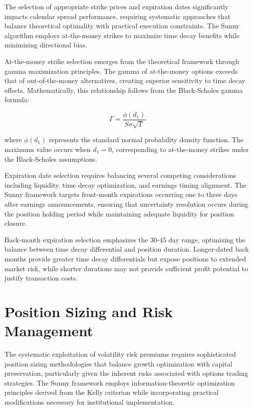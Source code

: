 \documentclass[
  american,
  11pt,
  11pt,
  letterpaper,
  onecolumn]{article}
\begin{document}
The selection of appropriate strike prices and expiration dates
significantly impacts calendar spread performance, requiring systematic
approaches that balance theoretical optimality with practical execution
constraints. The Sunny algorithm employs at-the-money strikes to
maximize time decay benefits while minimizing directional bias.

At-the-money strike selection emerges from the theoretical framework
through gamma maximization principles. The gamma of at-the-money options
exceeds that of out-of-the-money alternatives, creating superior
sensitivity to time decay effects. Mathematically, this relationship
follows from the Black-Scholes gamma formula:

\[\Gamma = \frac{\phi(d_1)}{S \sigma \sqrt{T}}\]

where \(\phi(d_1)\) represents the standard normal probability density
function. The maximum value occurs when \(d_1 = 0\), corresponding to
at-the-money strikes under the Black-Scholes assumptions.

Expiration date selection requires balancing several competing
considerations including liquidity, time decay optimization, and
earnings timing alignment. The Sunny framework targets front-month
expirations occurring one to three days after earnings announcements,
ensuring that uncertainty resolution occurs during the position holding
period while maintaining adequate liquidity for position closure.

Back-month expiration selection emphasizes the 30-45 day range,
optimizing the balance between time decay differential and position
duration. Longer-dated back months provide greater time decay
differentials but expose positions to extended market risk, while
shorter durations may not provide sufficient profit potential to justify
transaction costs.

\section{Position Sizing and Risk
Management}\label{position-sizing-and-risk-management}

The systematic exploitation of volatility risk premiums requires
sophisticated position sizing methodologies that balance growth
optimization with capital preservation, particularly given the inherent
risks associated with options trading strategies. The Sunny framework
employs information-theoretic optimization principles derived from the
Kelly criterion while incorporating practical modifications necessary
for institutional implementation.
\end{document}
